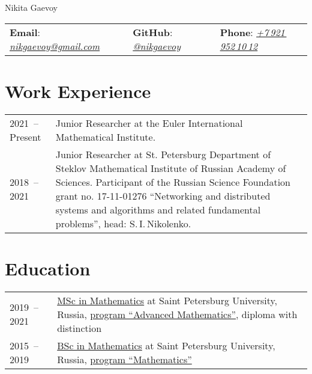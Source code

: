 \documentclass[a4paper, 11pt]{article}
\begin{document}


\begin{center}
	{\Huge Nikita Gaevoy}
\end{center}

\begin{center}
	\begin{tabular}{lll}
		\textbf{Email}: \href{mailto:nikgaevoy@gmail.com}{{\it nikgaevoy@gmail.com}} &
		\hspace{0.13cm} \textbf{GitHub}: \href{https://github.com/nikgaevoy}{{\it @nikgaevoy}} &
		\hspace{0.13cm} \textbf{Phone}: \href{tel:+79219521012}{{\it +7\,921\,952\,10\,12}}
	\end{tabular}
\end{center}

\section*{Work Experience}

\begin{tabularx}{\textwidth}{lX}
	2021~-- Present & Junior Researcher at the Euler International
	Mathematical Institute.
	\\
	2018~-- 2021 & Junior Researcher at St. Petersburg Department of Steklov Mathematical Institute of Russian Academy of Sciences. Participant of the Russian Science Foundation grant no. 17-11-01276 ``Networking and distributed systems and algorithms and related fundamental problems'', head: S.\,I.\,Nikolenko.
	\\
\end{tabularx}


\section*{Education}

\begin{tabularx}{\textwidth}{lX}
	2019~-- 2021 & \href{https://diploma.spbu.ru/s/?rn=3121007\&bd=19980122\&h=67a15239b3294582867a44ba9e42cf98}{MSc in Mathematics} at Saint Petersburg University, Russia, \href{https://math-cs.spbu.ru/en/msc-math-en/}{program ``Advanced Mathematics''}, diploma with distinction \\
	2015~-- 2019 & \href{https://diploma.spbu.ru/s/?rn=0911007\&bd=19980122\&h=a34dc3393d004d5fb149a60e3545b673}{BSc in Mathematics} at Saint Petersburg University, Russia, \href{https://math-cs.spbu.ru/en/}{program ``Mathematics''}
\end{tabularx}
\end{document}
